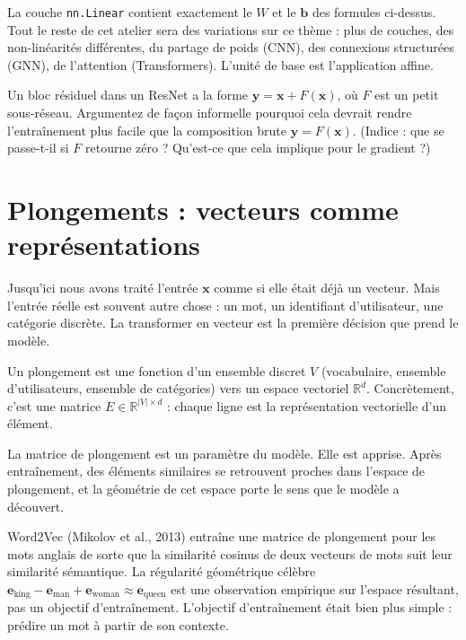 La couche \texttt{nn.Linear} contient exactement le $W$ et le $\bm{b}$ des formules ci-dessus. Tout le reste de cet atelier sera des variations sur ce thème : plus de couches, des non-linéarités différentes, du partage de poids (CNN), des connexions structurées (GNN), de l'attention (Transformers). L'unité de base est l'application affine.

\begin{exercise}
Un bloc résiduel dans un ResNet a la forme $\bm{y} = \bm{x} + F(\bm{x})$, où $F$ est un petit sous-réseau. Argumentez de façon informelle pourquoi cela devrait rendre l'entraînement plus facile que la composition brute $\bm{y} = F(\bm{x})$. (Indice : que se passe-t-il si $F$ retourne zéro ? Qu'est-ce que cela implique pour le gradient ?)
\end{exercise}

\section{Plongements : vecteurs comme représentations}

Jusqu'ici nous avons traité l'entrée $\bm{x}$ comme si elle était déjà un vecteur. Mais l'entrée réelle est souvent autre chose : un mot, un identifiant d'utilisateur, une catégorie discrète. La transformer en vecteur est la première décision que prend le modèle.

\begin{definition}[Plongement]
Un plongement est une fonction d'un ensemble discret $V$ (vocabulaire, ensemble d'utilisateurs, ensemble de catégories) vers un espace vectoriel $\mathbb{R}^d$. Concrètement, c'est une matrice $E \in \mathbb{R}^{|V| \times d}$ : chaque ligne est la représentation vectorielle d'un élément.
\end{definition}

La matrice de plongement est un paramètre du modèle. Elle est apprise. Après entraînement, des éléments similaires se retrouvent proches dans l'espace de plongement, et la géométrie de cet espace porte le sens que le modèle a découvert.

\begin{example}
Word2Vec (Mikolov et al., 2013) entraîne une matrice de plongement pour les mots anglais de sorte que la similarité cosinus de deux vecteurs de mots suit leur similarité sémantique. La régularité géométrique célèbre $\bm{e}_{\text{king}} - \bm{e}_{\text{man}} + \bm{e}_{\text{woman}} \approx \bm{e}_{\text{queen}}$ est une observation empirique sur l'espace résultant, pas un objectif d'entraînement. L'objectif d'entraînement était bien plus simple : prédire un mot à partir de son contexte.
\end{example}

